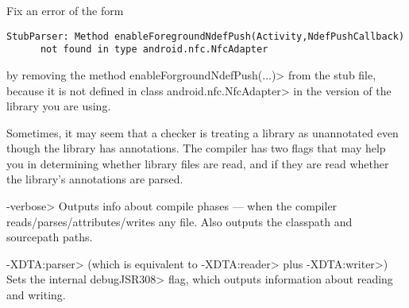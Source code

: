Fix an error of the form
\begin{Verbatim}
StubParser: Method enableForegroundNdefPush(Activity,NdefPushCallback)
      not found in type android.nfc.NfcAdapter
\end{Verbatim}

\noindent
by removing the method \<enableForgroundNdefPush(...)> from
the stub file, because it is not defined in class \<android.nfc.NfcAdapter>
in the version of the library you are using.



Sometimes, it may seem that a checker is treating a library as unannotated
even though the library has annotations.  The compiler has two flags that
may help you in determining whether library files are read, and if they are
read whether the library's annotations are parsed.

\begin{description}
\item \<-verbose>
  Outputs info about compile phases --- when the compiler
  reads/parses/attributes/writes any file.  Also outputs the classpath and
  sourcepath paths.
\item \<-XDTA:parser> (which is equivalent to \<-XDTA:reader> plus \<-XDTA:writer>)
  Sets the internal \<debugJSR308> flag, which outputs information about
  reading and writing.
\end{description}


